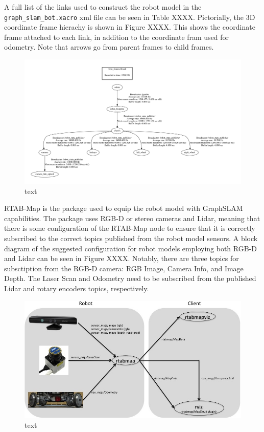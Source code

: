 \documentclass[a4paper]{article}
\begin{document}
A full list of the links used to construct the robot model in the \texttt{graph\_slam\_bot.xacro} xml file can be seen in Table XXXX. Pictorially, the 3D coordinate frame hierachy is shown in Figure XXXX. This shows the coordinate frame attached to each link, in addition to the coordinate fram used for odometry. Note that arrows go from parent frames to child frames.

\clearpage

\begin{figure}
	\centering
	\includegraphics[scale=0.5]{frames}
	\caption{text}
\end{figure}

\clearpage

RTAB-Map is the package used to equip the robot model with GraphSLAM capabilities. The package uses RGB-D or stereo cameras and Lidar, meaning that there is some configuration of the RTAB-Map node to ensure that it is correctly subscribed to the correct topics published from the robot model sensors. A block diagram of the suggested configuration for robot models employing both RGB-D and Lidar can be seen in Figure XXXX. Notably, there are three topics for subsctiption from the RGB-D camera: RGB Image, Camera Info, and Image Depth. The Laser Scan and Odometry need to be subscribed from the published Lidar and rotary encoders topics, respectively.

\begin{figure}[h]
	\centering
	\includegraphics[scale=0.5]{rtabmap_setup}
	\caption{text}
\end{figure}
\end{document}
